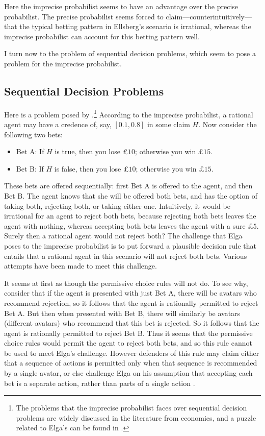 Here the imprecise probabilist seems to have an advantage over the precise probabilist. The precise probabilist seems forced to claim---counterintuitively---that the typical betting pattern in Ellsberg's scenario is irrational, whereas the imprecise probabilist can account for this betting pattern well. 

I turn now to the problem of sequential decision problems, which seem to pose a problem for the imprecise probabilist. 


\subsection{Sequential Decision Problems}

Here is a problem posed by \citet{Elga2010}.\footnote{The problems that the imprecise probabilist faces over sequential decision problems are widely discussed in the literature from economics, and a puzzle related to Elga's can be found in \citet{hammond1988orderly}.} According to the imprecise probabilist, a rational agent may have a credence of, say, $[0.1,0.8]$ in some claim $H$. Now consider the following two bets:
\begin{itemize}
\item[] Bet A: If $H$ is true, then you lose £$10$; otherwise you win £$15$.
\item[] Bet B: If $H$ is false, then you lose £$10$; otherwise you win £$15$.
\end{itemize}
These bets are offered sequentially: first Bet A is offered to the agent, and then Bet B. The agent knows that she will be offered both bets, and has the option of taking both, rejecting both, or taking either one. Intuitively, it would be irrational for an agent to reject both bets, because rejecting both bets leaves the agent with nothing, whereas accepting both bets leaves the agent with a sure £$5$. Surely then a rational agent would not reject both? The challenge that Elga poses to the imprecise probabilist is to put forward a plausible decision rule that entails that a rational agent in this scenario will not reject both bets. Various attempts have been made to meet this challenge.  

It seems at first as though the permissive choice rules will not do. To see why, consider that if the agent is presented with just Bet A, there will be avatars who recommend rejection, so it follows that the agent is rationally permitted to reject Bet A. But then when presented with Bet B, there will similarly be avatars (different avatars) who recommend that this bet is rejected. So it follows that the agent is rationally permitted to reject Bet B. Thus it seems that the permissive choice rules would permit the agent to reject both bets, and so this rule cannot be used to meet Elga's challenge. However defenders of this rule may claim either that a sequence of actions is permitted only when that sequence is recommended by a single avatar, or else challenge Elga on his assumption that accepting each bet is a separate action, rather than parts of a single action \citep{weatherson2003,Williams2014}. 

